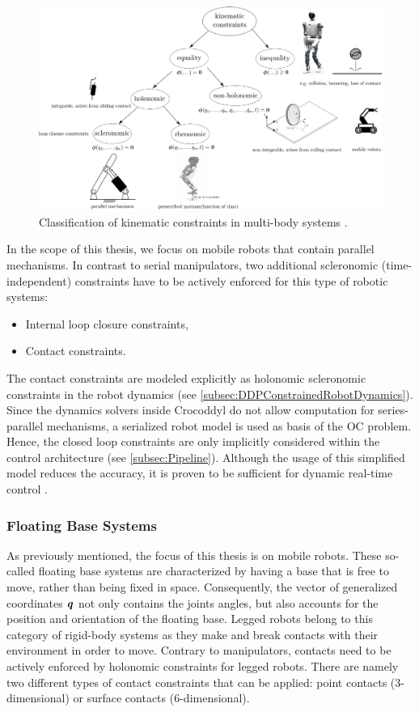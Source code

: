\begin{figure}
\centering	
\includegraphics[width=1\textwidth]{img/constraints}
\caption[Kinematic constraints in multi-body systems]{Classification of kinematic constraints in multi-body systems \cite{kumar2019modular}.}
\label{img:constraints}
\end{figure} 

In the scope of this thesis, we focus on mobile robots that contain parallel mechanisms. In contrast to serial manipulators, two additional scleronomic (time-independent) constraints have to be actively enforced for this type of robotic systems:
\begin{itemize}
\item Internal loop closure constraints,
\item Contact constraints.
\end{itemize}

The contact constraints are  modeled explicitly as holonomic scleronomic constraints in the robot dynamics (see \cref{subsec:DDPConstrainedRobotDynamics}). Since the dynamics solvers inside Crocoddyl do not allow computation for series-parallel mechanisms, a serialized robot model is used as basis of the \gls{OC} problem. Hence, the closed loop constraints are only implicitly considered within the control architecture (see \cref{subsec:Pipeline}). Although the usage of this simplified model reduces the accuracy, it is proven to be sufficient for dynamic real-time control \cite{kumar2019model}.

\subsubsection{Floating Base Systems}
As previously mentioned, the focus of this thesis is on mobile robots. These so-called floating base systems are characterized by having a base that is free to move, rather than being fixed in space. Consequently, the vector of generalized coordinates $\bm{\mathit{q}}$ not only contains the joints angles, but also accounts for the position and orientation of the floating base. Legged robots belong to this category of rigid-body systems as they make and break contacts with their environment in order to move. Contrary to manipulators, contacts need to be actively enforced by holonomic constraints for legged robots. There are namely two different types of contact constraints that can be applied: point contacts (3-dimensional) or surface contacts (6-dimensional). 

